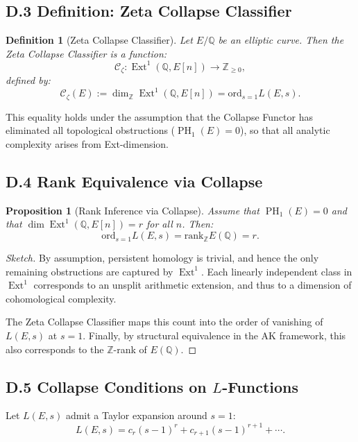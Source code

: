 \documentclass[11pt]{article}
\newtheorem{definition}[theorem]{Definition}
\newtheorem{proposition}[theorem]{Proposition}
\DeclareMathOperator{\Ext}{Ext}
\DeclareMathOperator{\PH}{PH}
\newcommand{\QQ}{\mathbb{Q}}
\newcommand{\ZZ}{\mathbb{Z}}
\begin{document}
\subsection*{D.3 Definition: Zeta Collapse Classifier}

\begin{definition}[Zeta Collapse Classifier]
Let $E/\QQ$ be an elliptic curve.  
Then the Zeta Collapse Classifier is a function:
\[
\mathcal{C}_{\zeta} : \Ext^1(\QQ,E[n]) \to \mathbb{Z}_{\geq 0},
\]
defined by:
\[
\mathcal{C}_{\zeta}(E) := \dim_{\ZZ} \Ext^1(\QQ,E[n]) = \mathrm{ord}_{s=1} L(E,s).
\]
\end{definition}

This equality holds under the assumption that the Collapse Functor has eliminated all topological obstructions ($\PH_1(E) = 0$), so that all analytic complexity arises from Ext-dimension.

\subsection*{D.4 Rank Equivalence via Collapse}

\begin{proposition}[Rank Inference via Collapse]
\label{prop:zeta-rank-collapse}
Assume that $\PH_1(E) = 0$ and that $\dim \Ext^1(\QQ,E[n]) = r$ for all $n$.  
Then:
\[
\mathrm{ord}_{s=1} L(E,s) = \mathrm{rank}_{\ZZ} E(\QQ) = r.
\]
\end{proposition}

\begin{proof}[Sketch]
By assumption, persistent homology is trivial, and hence the only remaining obstructions are captured by $\Ext^1$.  
Each linearly independent class in $\Ext^1$ corresponds to an unsplit arithmetic extension, and thus to a dimension of cohomological complexity.

The Zeta Collapse Classifier maps this count into the order of vanishing of $L(E,s)$ at $s=1$.  
Finally, by structural equivalence in the AK framework, this also corresponds to the $\ZZ$-rank of $E(\QQ)$.
\end{proof}

\subsection*{D.5 Collapse Conditions on $L$-Functions}

Let $L(E,s)$ admit a Taylor expansion around $s=1$:
\[
L(E,s) = c_r (s-1)^r + c_{r+1} (s-1)^{r+1} + \cdots.
\]
\end{document}
